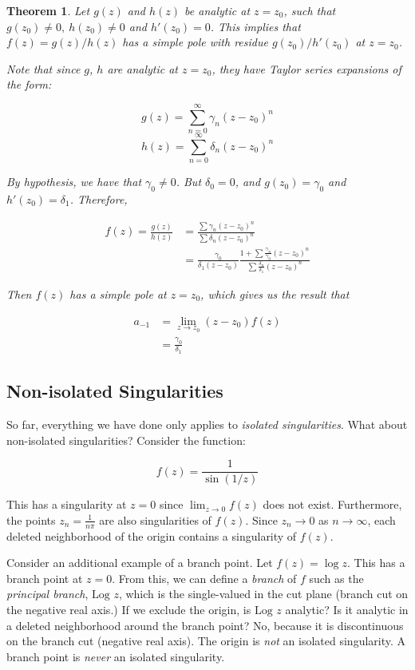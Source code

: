\documentclass{article}
\newtheorem{theorem}{Theorem}[section]
\theoremstyle{definition}
\begin{document}
\begin{theorem}
Let $g(z)$ and $h(z)$ be analytic at $z=z_0$, such that $g(z_0) \neq 0,\ h(z_0) \neq 0$ and $h'(z_0) = 0$. This implies that $f(z) = g(z)/h(z)$ has a simple pole with residue $g(z_0)/h'(z_0)$ at $z=z_0$. 

Note that since $g$, $h$ are analytic at $z=z_0$, they have Taylor series expansions of the form:

$$g(z) = \sum_{n=0}^\infty \gamma_n (z-z_0)^n $$
$$h(z) = \sum_{n=0}^\infty \delta_n (z-z_0)^n $$


By hypothesis, we have that $\gamma_0 \neq 0$. But $\delta_0 = 0$, and $g(z_0) = \gamma_0$ and $h'(z_0) = \delta_1$. Therefore, 

\begin{align*}
f(z) = \frac{g(z)}{h(z)} & = \frac{\sum\gamma_n (z-z_0)^n}{\sum\delta_n (z-z_0)^n} \\ 
& = \frac{\gamma_0}{\delta_1 (z-z_0)} \frac{1 + \sum\frac{\gamma_n}{\gamma_0} (z-z_0)^n}{\sum\frac{\delta_n}{\delta_1} (z-z_0)^n} 
\end{align*}

Then $f(z)$ has a simple pole at $z=z_0$, which gives us the result that 

\begin{align*}
a_{-1} &= \lim_{z \to z_0}(z-z_0) f(z) \\ 
& = \frac{\gamma_0}{\delta_1}
\end{align*}
\end{theorem}

\subsection{Non-isolated Singularities }
So far, everything we have done only applies to \textit{isolated singularities}. What about non-isolated singularities? Consider the function:

$$f(z) = \frac{1}{\sin(1/z)}$$

This has a singularity at $z=0$ since $\lim_{z\to0} f(z)$ does not exist. Furthermore, the points $z_n = \frac{1}{n\pi}$ are also singularities of $f(z)$. Since $z_n \to 0$ as $n \to \infty$, each deleted neighborhood of the origin contains a singularity of $f(z)$. 


Consider an additional example of a branch point. Let $f(z) = \log z$. This has a branch point at $z=0$. From this, we can define a \textit{branch} of $f$ such as the \textit{principal branch}, $\text{Log } z$, which is the single-valued in the cut plane (branch cut on the negative real axis.) If we exclude the origin, is $\text{Log }z$ analytic? Is it analytic in a deleted neighborhood around the branch point? No, because it is discontinuous on the branch cut (negative real axis). The origin is \textit{not} an isolated singularity. A branch point is \textit{never} an isolated singularity.
\end{document}
